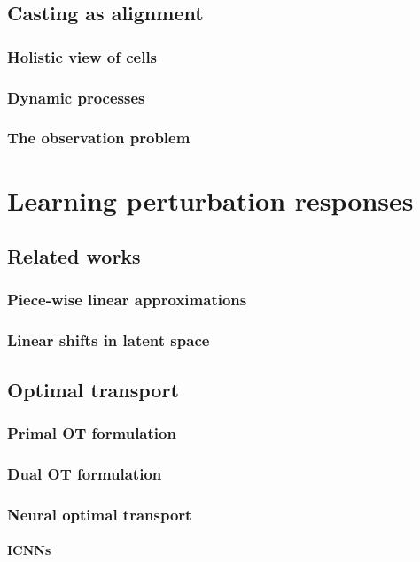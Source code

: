 \section{Casting as alignment}
\subsection{Holistic view of cells}
\subsection{Dynamic processes}
\subsection{The observation problem}



\chapter{Learning perturbation responses}
\section{Related works}
\subsection{Piece-wise linear approximations}
\subsection{Linear shifts in latent space}

\section{Optimal transport}
\subsection{Primal OT formulation}
\subsection{Dual OT formulation}
\subsection{Neural optimal transport}
\subsubsection{ICNNs}

